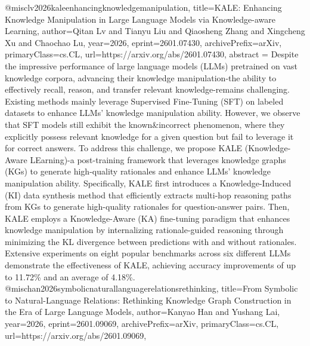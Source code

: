{}@misc{lv2026kaleenhancingknowledgemanipulation,
      title={KALE: Enhancing Knowledge Manipulation in Large Language Models via Knowledge-aware Learning}, 
      author={Qitan Lv and Tianyu Liu and Qiaosheng Zhang and Xingcheng Xu and Chaochao Lu},
      year={2026},
      eprint={2601.07430},
      archivePrefix={arXiv},
      primaryClass={cs.CL},
      url={https://arxiv.org/abs/2601.07430},
      abstract = {Despite the impressive performance of large language models (LLMs) pretrained on vast knowledge corpora, advancing their knowledge manipulation-the ability to effectively recall, reason, and transfer relevant knowledge-remains challenging. Existing methods mainly leverage Supervised Fine-Tuning (SFT) on labeled datasets to enhance LLMs' knowledge manipulation ability. However, we observe that SFT models still exhibit the known&incorrect phenomenon, where they explicitly possess relevant knowledge for a given question but fail to leverage it for correct answers. To address this challenge, we propose KALE (Knowledge-Aware LEarning)-a post-training framework that leverages knowledge graphs (KGs) to generate high-quality rationales and enhance LLMs' knowledge manipulation ability. Specifically, KALE first introduces a Knowledge-Induced (KI) data synthesis method that efficiently extracts multi-hop reasoning paths from KGs to generate high-quality rationales for question-answer pairs. Then, KALE employs a Knowledge-Aware (KA) fine-tuning paradigm that enhances knowledge manipulation by internalizing rationale-guided reasoning through minimizing the KL divergence between predictions with and without rationales. Extensive experiments on eight popular benchmarks across six different LLMs demonstrate the effectiveness of KALE, achieving accuracy improvements of up to 11.72\% and an average of 4.18\%.}
}@misc{han2026symbolicnaturallanguagerelationsrethinking,
      title={From Symbolic to Natural-Language Relations: Rethinking Knowledge Graph Construction in the Era of Large Language Models}, 
      author={Kanyao Han and Yushang Lai},
      year={2026},
      eprint={2601.09069},
      archivePrefix={arXiv},
      primaryClass={cs.CL},
      url={https://arxiv.org/abs/2601.09069},
}
